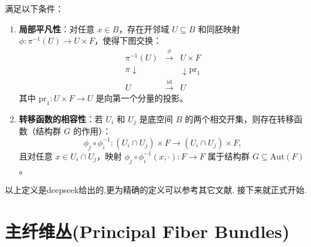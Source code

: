 \documentclass[../main.tex]{subfiles}
\begin{document}
满足以下条件：
\begin{enumerate}
    \item \textbf{局部平凡性}：对任意 \(x \in B\)，存在开邻域 \(U \subseteq B\) 和同胚映射 \(\phi: \pi^{-1}(U) \to U \times F\)，使得下图交换：
    \[
    \begin{array}{ccc}
        \pi^{-1}(U) & \xrightarrow{\phi} & U \times F \\
        \pi \downarrow & & \downarrow \mathrm{pr}_1 \\
        U & \xrightarrow{\mathrm{id}} & U
    \end{array}
    \]
    其中 \(\mathrm{pr}_1: U \times F \to U\) 是向第一个分量的投影。

    \item \textbf{转移函数的相容性}：若 \(U_i\) 和 \(U_j\) 是底空间 \(B\) 的两个相交开集，则存在转移函数（结构群 \(G\) 的作用）：
    \[
        \phi_j \circ \phi_i^{-1}: (U_i \cap U_j) \times F \to (U_i \cap U_j) \times F,
    \]
    且对任意 \(x \in U_i \cap U_j\)，映射 \(\phi_j \circ \phi_i^{-1}(x, \cdot): F \to F\) 属于结构群 \(G \subseteq \mathrm{Aut}(F)\)。
\end{enumerate}
以上定义是deepseek给出的,更为精确的定义可以参考其它文献.
 接下来就正式开始.
 \chapter{主纤维丛(Principal Fiber Bundles)}
\end{document}
